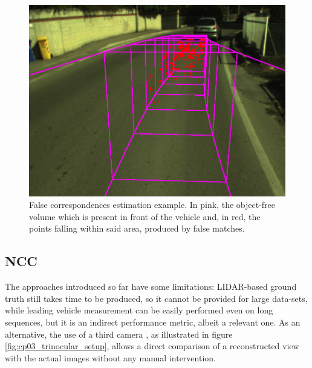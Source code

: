 \begin{figure}[h!]
\centering
\includegraphics{fc}
\caption{False correspondences estimation example. In pink, the object-free volume which is present in front of the vehicle and, in red, the points falling within said area, produced by false matches.}\label{fig:cp03_fc}
\end{figure}

\subsection{\acf{NCC}}\label{ch:chapter03_01_03}

The approaches introduced so far have some limitations: LIDAR-based ground truth still takes time to be produced, so it cannot be provided for large data-sets, while leading vehicle measurement can be easily performed even on long sequences, but it is an indirect performance metric, albeit a relevant one. As an alternative, the use of a third camera \citep{Morales2009}, as illustrated in figure \ref{fig:cp03_trinocular_setup}, allows a direct comparison of a reconstructed view with the actual images without any manual intervention. 

